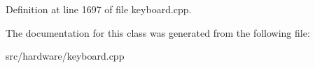 Definition at line 1697 of file keyboard.\-cpp.



The documentation for this class was generated from the following file\-:\begin{DoxyCompactItemize}
\item 
src/hardware/keyboard.\-cpp\end{DoxyCompactItemize}
